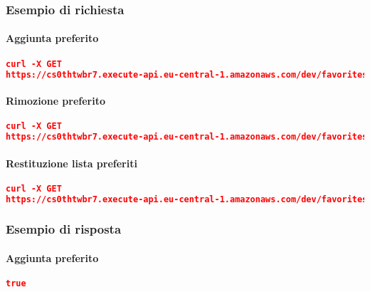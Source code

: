 \subsubsection{Esempio di richiesta}
\paragraph{Aggiunta preferito}
\begin{lstlisting}[language=json, caption={Esempio di richiesta \texttt{/favorites} per l'aggiunta di un preferito}, captionpos=b]
curl -X GET 
https://cs0thtwbr7.execute-api.eu-central-1.amazonaws.com/dev/favorites?action=add&user=515d659b-baec-413b-9b37-703498372093&restaurant=100
\end{lstlisting}

\paragraph{Rimozione preferito}
\begin{lstlisting}[language=json, caption={Esempio di richiesta \texttt{/favorites} per la rimozione di un preferito}, captionpos=b]
curl -X GET 
https://cs0thtwbr7.execute-api.eu-central-1.amazonaws.com/dev/favorites?action=remove&user=515d659b-baec-413b-9b37-703498372093&restaurant=100
\end{lstlisting}



\paragraph{Restituzione lista preferiti}
\begin{lstlisting}[language=json, caption={Esempio di richiesta \texttt{/favorites} per la restituzione della lista dei preferiti}, captionpos=b]
curl -X GET 
https://cs0thtwbr7.execute-api.eu-central-1.amazonaws.com/dev/favorites?action=get&user=515d659b-baec-413b-9b37-703498372093
\end{lstlisting}

\pagebreak

\subsubsection{Esempio di risposta}
\paragraph{Aggiunta preferito}
\begin{lstlisting}[language=json, caption={Esempio di risposta \texttt{/favorites} per l’aggiunta di un preferito}, captionpos=b]
true
\end{lstlisting}

